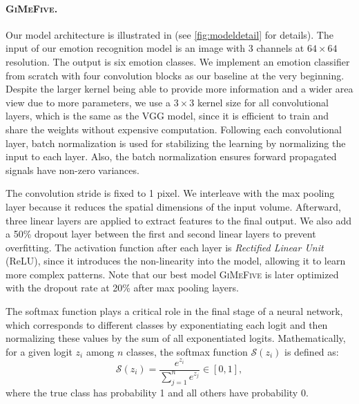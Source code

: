 \paragraph{\textsc{GiMeFive}.}
Our model architecture is illustrated in  (see \cref{fig:modeldetail} for details). 
The input of our emotion recognition model is an image with 3 channels at $64 \times 64 $ resolution. 
The output is six emotion classes. 
We implement an emotion classifier from scratch with four convolution blocks as our baseline at the very beginning. 
Despite the larger kernel being able to provide more information and a wider area view due to more parameters, 
we use a $3 \times 3$ kernel size for all convolutional layers, 
which is the same as the VGG model, 
since it is efficient to train and share the weights without expensive computation. 
Following each convolutional layer, 
batch normalization is used for stabilizing the learning by normalizing the input to each layer. 
Also, 
the batch normalization ensures forward propagated signals have non-zero variances. 

The convolution stride is fixed to 1 pixel. 
We interleave with the max pooling layer because it reduces the spatial dimensions of the input volume. 
Afterward, three linear layers are applied to extract features to the final output. 
We also add a 50\% dropout layer between the first and second linear layers to prevent overfitting. 
The activation function after each layer is \textit{Rectified Linear Unit} (ReLU), 
since it introduces the non-linearity into the model, 
allowing it to learn more complex patterns. 
Note that our best model \textsc{GiMeFive} is later optimized with the dropout rate at 20\% after max pooling layers. 

The softmax function plays a critical role in the final stage of a neural network, 
which corresponds to different classes by exponentiating each logit and then normalizing these values by the sum of all exponentiated logits. 
Mathematically, for a given logit $z_i$ among $n$ classes, 
the softmax function $\mathcal{S}(z_i)$ is defined as: 
\begin{equation}
  \label{eq:softmax}
  \mathcal{S}(z_i) = \frac{e^{z_i}}{\sum_{j=1}^{n} e^{z_j}} \in [0,1], 
\end{equation}
where the true class has probability 1 and all others have probability 0. 


